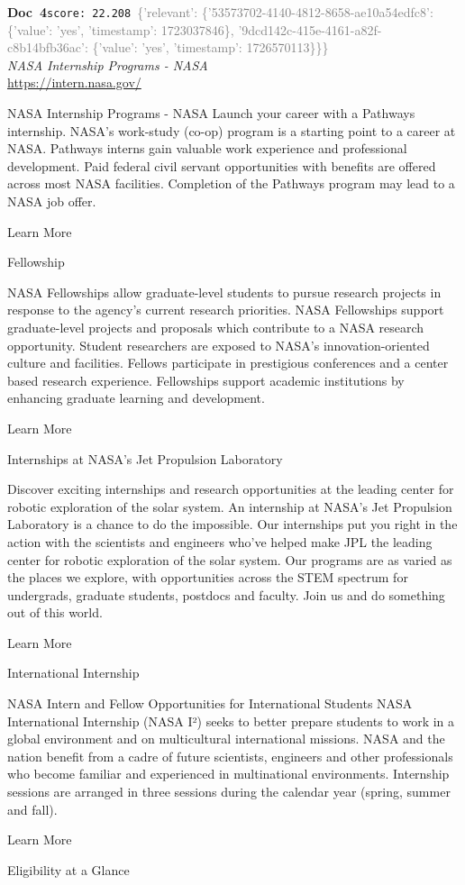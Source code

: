 \documentclass[a4paper,11pt]{article}
\begin{document}
\begin{docenv}
{\footnotesize\textcolor{doccolor}{\textbf{Doc~4}}}\hfill{\tiny\texttt{score:~22.208}}\ {\tiny\textcolor{gray}{\{'relevant': \{'53573702-4140-4812-8658-ae10a54edfc8': \{'value': 'yes', 'timestamp': 1723037846\}, '9dcd142c-415e-4161-a82f-c8b14bfb36ac': \{'value': 'yes', 'timestamp': 1726570113\}\}\}}}\\[3pt]
{\small\textit{NASA Internship Programs - NASA}}\\[2pt]
{\tiny\url{https://intern.nasa.gov/}}\\[4pt]
{\footnotesize NASA Internship Programs - NASA
Launch your career with a Pathways internship.
NASA’s work-study (co-op) program is a starting point to a career at NASA. Pathways interns gain valuable work experience and professional development. Paid federal civil servant opportunities with benefits are offered across most NASA facilities. Completion of the Pathways program may lead to a NASA job offer.

	Learn More 	

 

Fellowship

NASA Fellowships allow graduate-level students to pursue research projects in response to the agency’s current research priorities.
NASA Fellowships support graduate-level projects and proposals which contribute to a NASA research opportunity. Student researchers are exposed to NASA’s innovation-oriented culture and facilities. Fellows participate in prestigious conferences and a center based research experience. Fellowships support academic institutions by enhancing graduate learning and development.

	Learn More 	

 

Internships at NASA’s Jet Propulsion Laboratory

Discover exciting internships and research opportunities at the leading center for robotic exploration of the solar system.
An internship at NASA’s Jet Propulsion Laboratory is a chance to do the impossible. Our internships put you right in the action with the scientists and engineers who’ve helped make JPL the leading center for robotic exploration of the solar system. Our programs are as varied as the places we explore, with opportunities across the STEM spectrum for undergrads, graduate students, postdocs and faculty. Join us and do something out of this world.

	Learn More 	

 

International Internship

NASA Intern and Fellow Opportunities for International Students
NASA International Internship (NASA I²) seeks to better prepare students to work in a global environment and on multicultural international missions. NASA and the nation benefit from a cadre of future scientists, engineers and other professionals who become familiar and experienced in multinational environments. Internship sessions are arranged in three sessions during the calendar year (spring, summer and fall). 

	Learn More 	

 

Eligibility at a Glance}
\end{docenv}
\end{document}
